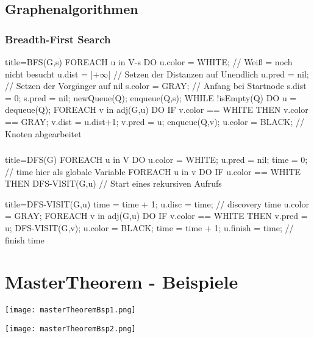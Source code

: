 \subsection{Graphenalgorithmen}
\subsubsection{Breadth-First Search}
        \begin{ccode}[autogobble, escapeinside=||]{title={BFS(G,s)}}
        FOREACH u in V-{s} DO
            u.color = WHITE;        // Weiß = noch nicht besucht
            u.dist = |$+\infty$|            // Setzen der Distanzen auf Unendlich
            u.pred = nil;           // Setzen der Vorgänger auf nil
        s.color = GRAY;             // Anfang bei Startnode
        s.dist = 0;
        s.pred = nil;
        newQueue(Q);
        enqueue(Q,s);
        WHILE !isEmpty(Q) DO
            u = dequeue(Q); 
            FOREACH v in adj(G,u) DO
                IF v.color == WHITE THEN
                    v.color == GRAY;
                    v.dist = u.dist+1;
                    v.pred = u;
                    enqueue(Q,v);
            u.color = BLACK;            // Knoten abgearbeitet
        \end{ccode}

\subsubsection{}
        \begin{ccode}[autogobble, escapeinside=||]{title={DFS(G)}}
        FOREACH u in V DO
            u.color = WHITE;
            u.pred = nil;
        time = 0;               // time hier als globale Variable
        FOREACH u in v DO
            IF u.color == WHITE THEN
                DFS-VISIT(G,u)  // Start eines rekursiven Aufrufs
        \end{ccode}

        \begin{ccode}[autogobble, escapeinside=||]{title={DFS-VISIT(G,u)}}
        time = time + 1;
        u.disc = time;          // discovery time
        u.color = GRAY;
        FOREACH v in adj(G,u) DO
            IF v.color == WHITE THEN
                v.pred = u;
                DFS-VISIT(G,v);
        u.color = BLACK;
        time = time + 1;
        u.finish = time;        // finish time
        \end{ccode}
\section*{MasterTheorem - Beispiele}

\centerline{\texttt{[image: masterTheoremBsp1.png]}}
\centerline{\texttt{[image: masterTheoremBsp2.png]}}
    
